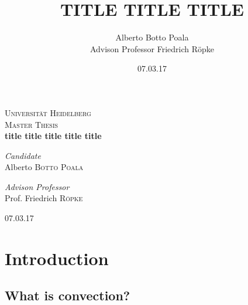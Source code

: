 \documentclass[11pt]{article}
\title{TITLE TITLE TITLE}
\author{Alberto Botto Poala\\
Advison Professor Friedrich Röpke}
\date{07.03.17}
\begin{document}
\begin{titlepage}
\begin{center}


\textsc{\LARGE Universität Heidelberg}\\[1.8cm]

\textsc{\Large Master Thesis}\\[0.5cm]


{ \huge \bfseries title title title title title \\[0.5cm] }



\begin{minipage}{0.4\textwidth}
\begin{flushleft} \large
\emph{Candidate}\\
Alberto \textsc{Botto Poala}
\end{flushleft}
\end{minipage}
\begin{minipage}{0.4\textwidth}
\begin{flushright} \large
\emph{Advison Professor} \\
Prof. Friedrich \textsc{Röpke}
\end{flushright}
\end{minipage}

\vfill

{07.03.17}

\end{center}
\end{titlepage}

\tableofcontents
\maketitle


\section{Introduction}
\subsection{What is convection?}
\end{document}
